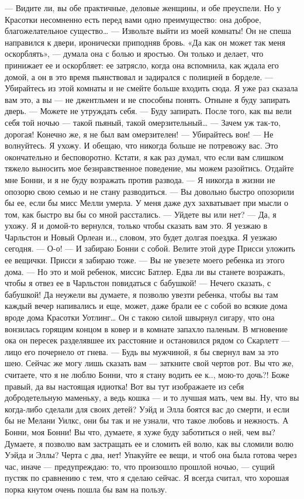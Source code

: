 — Видите ли, вы обе практичные, деловые женщины, и обе преуспели. Но у Красотки несомненно есть перед вами одно преимущество: она доброе, благожелательное существо…
— Извольте выйти из моей комнаты!
Он не спеша направился к двери, иронически приподняв бровь. «Да как он может так меня оскорблять», — думала она с болью и яростью. Он только и делает, что принижает ее и оскорбляет: ее затрясло, когда она вспомнила, как ждала его домой, а он в это время пьянствовал и задирался с полицией в борделе.
— Убирайтесь из этой комнаты и не смейте больше входить сюда. Я уже раз сказала вам это, а вы — не джентльмен и не способны понять. Отныне я буду запирать дверь.
— Можете не утруждать себя.
— Буду запирать. После того, как вы вели себя той ночью — такой пьяный, такой омерзительный…
— Зачем уж так-то, дорогая! Конечно же, я не был вам омерзителен!
— Убирайтесь вон!
— Не волнуйтесь. Я ухожу. И обещаю, что никогда больше не потревожу вас. Это окончательно и бесповоротно. Кстати, я как раз думал, что если вам слишком тяжело выносить мое безнравственное поведение, мы можем разойтись. Отдайте мне Бонни, и я не буду возражать против развода.
— Я никогда в жизни не опозорю свою семью и не стану разводиться.
— Вы довольно быстро опозорили бы ее, если бы мисс Мелли умерла. У меня даже дух захватывает при мысли о том, как быстро вы бы со мной расстались.
— Уйдете вы или нет?
— Да, я ухожу. Я и домой-то вернулся, только чтобы сказать вам это. Я уезжаю в Чарльстон и Новый Орлеан и.., словом, это будет долгая поездка. Я уезжаю сегодня.
— О-о!
— И забираю Бонни с собой. Велите этой дуре Присси уложить ее вещички. Присси я забираю тоже.
— Вы не увезете моего ребенка из этого дома.
— Но это и мой ребенок, миссис Батлер. Едва ли вы станете возражать, чтобы я отвез ее в Чарльстон повидаться с бабушкой!
— Нечего сказать, с бабушкой! Да неужели вы думаете, я позволю увезти ребенка, чтобы вы там каждый вечер напивались и еще, может, даже брали ее с собой во всякие дома вроде дома Красотки Уотлинг…
Он с такою силой швырнул сигару, что она вонзилась горящим концом в ковер и в комнате запахло паленым. В мгновение ока он пересек разделявшее их расстояние и остановился рядом со Скарлетт — лицо его почернело от гнева.
— Будь вы мужчиной, я бы свернул вам за это шею. Сейчас же могу лишь сказать вам — заткните свой чертов рот. Вы что же, считаете, что я не люблю Бонни, что я стану водить ее к.., мою-то дочь?! Боже правый, да вы настоящая идиотка! Вот вы тут изображаете из себя добродетельную маменьку, а ведь кошка — и то лучшая мать, чем вы. Ну, что вы когда-либо сделали для своих детей? Уэйд и Элла боятся вас до смерти, и если бы не Мелани Уилкс, они бы так и не узнали, что такое любовь и нежность. А Бонни, моя Бонни! Вы что, думаете, я хуже буду заботиться о ней, чем вы? Думаете, я позволю вам застращать ее и сломить ей волю, как вы сломили волю Уэйда и Эллы? Черта с два, нет! Упакуйте ее вещи, и чтоб она была готова через час, иначе — предупреждаю: то, что произошло прошлой ночью, — сущий пустяк по сравнению с тем, что я сделаю сейчас. Я всегда считал, что хорошая порка кнутом очень пошла бы вам на пользу.
